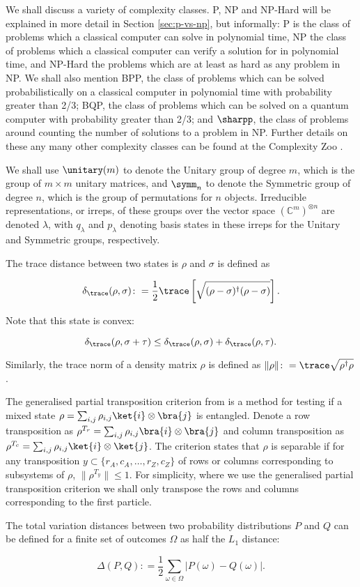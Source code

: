 We shall discuss a variety of complexity classes. P, NP and NP-Hard will be explained in more detail in Section \ref{sec:p-vs-np}, but informally: P is the class of problems which a classical computer can solve in polynomial time, NP the class of problems which a classical computer can verify a solution for in polynomial time, and NP-Hard the problems which are at least as hard as any problem in NP. We shall also mention BPP, the class of problems which can be solved probabilistically on a classical computer in polynomial time with probability greater than 2/3; BQP, the class of problems which can be solved on a quantum computer with probability greater than 2/3; and $\sharpp$, the class of problems around counting the number of solutions to a problem in NP. Further details on these any many other complexity classes can be found at the Complexity Zoo \cite{complexityzoo}.

We shall use $\unitary(m)$ to denote the Unitary group of degree $m$, which is the group of $m\times m$ unitary matrices, and $\symm_n$ to denote the Symmetric group of degree $n$, which is the group of permutations for $n$ objects. Irreducible representations, or irreps, of these groups over the vector space $(\mathbb{C}^m)^{\otimes n}$ are denoted $\lambda$, with $q_\lambda$ and $p_\lambda$ denoting basis states in these irreps for the Unitary and Symmetric groups, respectively.

The trace distance between two states is $\rho$ and $\sigma$ is defined as

\begin{equation}
\delta_{\trace}(\rho, \sigma) \colon= \frac{1}{2}\trace\left[\sqrt{(\rho-\sigma)^\dagger(\rho-\sigma)}\right].
\end{equation}

\noindent Note that this state is convex:

\begin{equation}
\delta_{\trace}(\rho, \sigma + \tau) \leq \delta_{\trace}(\rho, \sigma) + \delta_{\trace}(\rho, \tau).
\end{equation}

\noindent Similarly, the trace norm of a density matrix $\rho$ is defined as $\|\rho\| \colon= \trace\sqrt{\rho^\dagger\rho}$.

The generalised partial transposition criterion from \cite{chen2002} is a method for testing if a mixed state $\rho = \sum_{i,j}\rho_{i,j}\ket{i}\otimes\bra{j}$ is entangled. Denote a row transposition as $\rho^{T_{r}} = \sum_{i,j}\rho_{i,j}\bra{i}\otimes\bra{j}$ and column transposition as $\rho^{T_{c}} = \sum_{i,j}\rho_{i,j}\ket{i}\otimes\ket{j}$. The criterion states that $\rho$ is separable if for any transposition $y \subset \{r_A,c_A,\dots,r_Z,c_Z\}$ of rows or columns corresponding to subsystems of $\rho$, $\|\rho^{T_y}\| \leq 1$. For simplicity, where we use the generalised partial transposition criterion we shall only transpose the rows and columns corresponding to the first particle.

The total variation distances between two probability distributions $P$ and $Q$ can be defined for a finite set of outcomes $\Omega$ as half the $L_1$ distance:

\begin{equation}
\Delta(P, Q) \colon= \frac{1}{2}\sum_{\omega \in \Omega}|P(\omega) - Q(\omega)|.
\end{equation}
